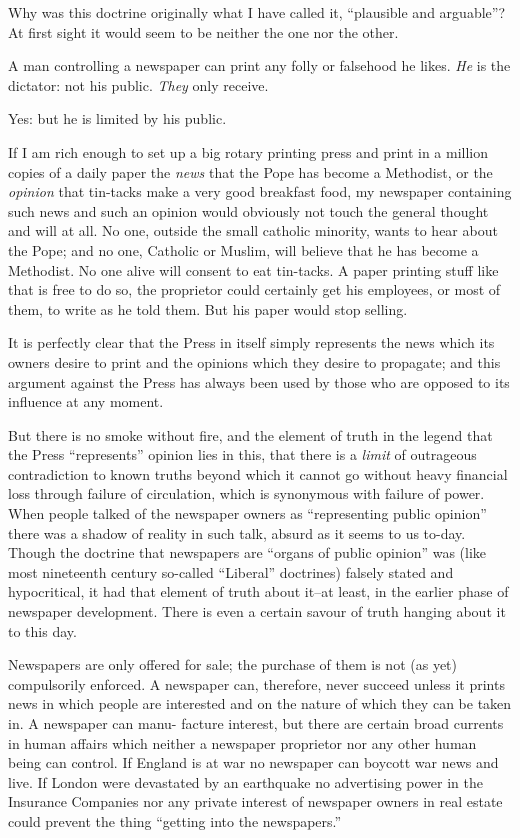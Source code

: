 \documentclass{book}
\begin{document}
Why was this doctrine originally what I have called it, “plausible and arguable”? At first sight it would seem to be neither the one nor the other.

A man controlling a newspaper can print any folly or falsehood he likes. \emph{He} is the dictator: not his public. \emph{They} only receive.

Yes: but he is limited by his public.

If I am rich enough to set up a big rotary printing press and print in a million copies of a daily paper the \emph{news} that the Pope has become a Methodist, or the \emph{opinion} that tin-tacks make a very good breakfast food, my newspaper containing such news and such an opinion would obviously not touch the general thought and will at all. No one, outside the small catholic minority, wants to hear about the Pope; and no one, Catholic or Muslim, will believe that he has become a Methodist. No one alive will consent to eat tin-tacks. A paper printing stuff like that is free to do so, the proprietor could certainly get his employees, or most of them, to write as he told them. But his paper would stop selling.

It is perfectly clear that the Press in itself simply represents the news which its owners desire to print and the opinions which they desire to propagate; and this argument against the Press has always been used by those who are opposed to its influence at any moment.

But there is no smoke without fire, and the element of truth in the legend that the Press “represents” opinion lies in this, that there is a \emph{limit} of outrageous contradiction to known truths beyond which it cannot go without heavy financial loss through failure of circulation, which is synonymous with failure of power. When people talked of the newspaper owners as “representing public opinion” there was a shadow of reality in such talk, absurd as it seems to us to-day. Though the doctrine that newspapers are “organs of public opinion” was (like most nineteenth century so-called “Liberal” doctrines) falsely stated and hypocritical, it had that element of truth about it–at least, in the earlier phase of newspaper development. There is even a certain savour of truth hanging about it to this day.

Newspapers are only offered for sale; the purchase of them is not (as yet) compulsorily enforced. A newspaper can, therefore, never succeed unless it prints news in which people are interested and on the nature of which they can be taken in. A newspaper can manu- facture interest, but there are certain broad currents in human affairs which neither a newspaper proprietor nor any other human being can control. If England is at war no newspaper can boycott war news and live. If London were devastated by an earthquake no advertising power in the Insurance Companies nor any private interest of newspaper owners in real estate could prevent the thing “getting into the newspapers.”
\end{document}
